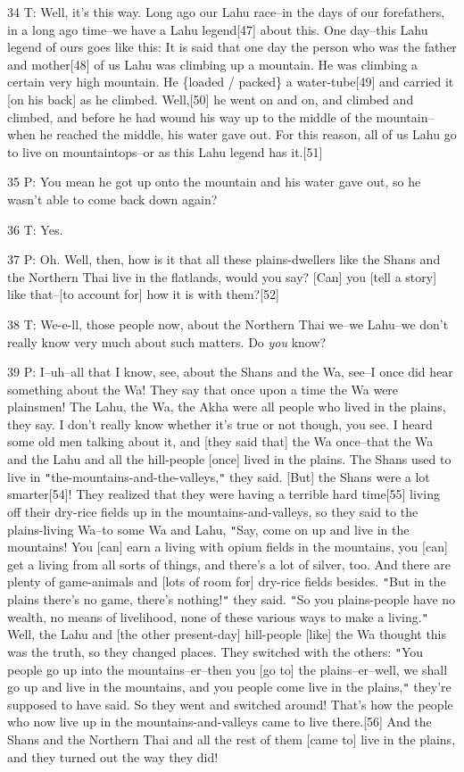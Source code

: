 {34 T: Well, it's this way. Long ago our Lahu race--in the days of our forefathers,
in a long ago time--we have a Lahu legend[47] about this. One day--this Lahu legend
of ours goes like this: It is said that one day the person who was the father and
mother[48] of us Lahu was climbing up a mountain. He was climbing a certain very
high mountain. He \{loaded / packed\} a water-tube[49] and carried it [on his back]
as he climbed. Well,[50] he went on and on, and climbed and climbed, and before
he had wound his way up to the middle of the mountain--when he reached the middle,
his water gave out. For this reason, all of us Lahu go to live on mountaintops--or
as this Lahu legend has it.[51]}

{35 P: You mean he got up onto the mountain and his water gave out, so he
wasn't able to come back down again?}

{36 T: Yes.}

{37 P: Oh. Well, then, how is it that all these plains-dwellers like the
Shans and the Northern Thai live in the flatlands, would you say? [Can] you [tell
a story] like that--[to account for] how it is with them?[52]}

{38 T: We-e-ll, those people now, about the Northern Thai we--we Lahu--we
don't really know very much about such matters. Do }{\textit{you}}{
know? }

{39 P: I--uh--all that I know, see, about the Shans and the Wa, see--I once
did hear something about the Wa! They say that once upon a time the Wa were plainsmen!
The Lahu, the Wa, the Akha were all people who lived in the plains, they say. I
don't really know whether it's true or not though, you see. I heard some old men
talking about it, and [they said that] the Wa once--that the Wa and the Lahu and
all the hill-people [once] lived in the plains. The Shans used to live in \texttt{"}the-mountains-and-the-valleys,\texttt{"}
they said. [But] the Shans were a lot smarter[54]! They realized that they were
having a terrible hard time[55] living off their dry-rice fields up in the mountains-and-valleys,
so they said to the plains-living Wa--to some Wa and Lahu, \texttt{"}Say, come
on up and live in the mountains! You [can] earn a living with opium fields in the
mountains, you [can] get a living from all sorts of things, and there's a lot of
silver, too. And there are plenty of game-animals and [lots of room for] dry-rice
fields besides. \texttt{"}But in the plains there's no game, there's nothing!\texttt{"}
they said. \texttt{"}So you plains-people have no wealth, no means of livelihood,
none of these various ways to make a living.\texttt{"} Well, the Lahu and [the
other present-day] hill-people [like] the Wa thought this was the truth, so they
changed places. They switched with the others: \texttt{"}You people go up into
the mountains--er--then you [go to] the plains--er--well, we shall go up and live
in the mountains, and you people come live in the plains,\texttt{"} they're supposed
to have said. So they went and switched around! That's how the people who now live
up in the mountains-and-valleys came to live there.[56] And the Shans and the Northern
Thai and all the rest of them [came to] live in the plains, and they turned out
the way they did! }

